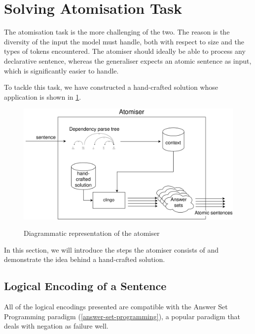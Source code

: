 \section{Solving Atomisation Task}
\label{solving-atomisation-task}

The atomisation task is the more challenging of the two.
The reason is the diversity of the input the model must handle, both with respect to size and the types of tokens encountered.
The atomiser should ideally be able to process any declarative sentence, whereas the generaliser expects an atomic sentence as input, which is significantly easier to handle. 

To tackle this task, we have constructed a hand-crafted solution whose application is shown in \ref{atomisation-diagram}.

\begin{figure}[h]
\caption{Diagrammatic representation of the atomiser}
\vspace{5pt}
\centering
\includegraphics[width=\textwidth]{solving-nlp-tasks-logically/Atomisation diagram.png}
\label{atomisation-diagram}
\end{figure}

In this section, we will introduce the steps the atomiser consists of and demonstrate the idea behind a hand-crafted solution.

\subsection{Logical Encoding of a Sentence}
\label{logical-encoding}

All of the logical encodings presented are compatible with the Answer Set Programming paradigm (\ref{answer-set-programming}), a popular paradigm that deals with negation as failure well.

